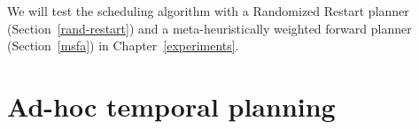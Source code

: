 We will test the scheduling algorithm with a Randomized Restart planner (Section~\ref{rand-restart})
and a meta-heuristically weighted forward planner (Section~\ref{msfa}) in Chapter~\ref{experiments}.



























\section{Ad-hoc temporal planning}\label{temporal-approach}

